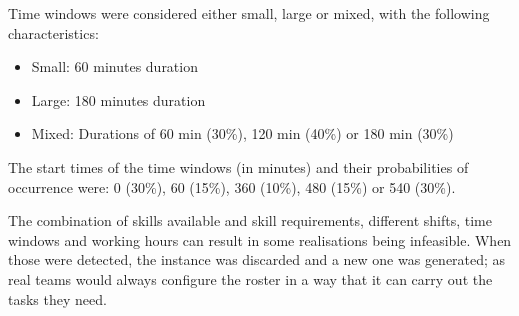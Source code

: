 Time windows were considered either small, large or mixed, with the following characteristics:
\begin{itemize}
	\item Small: 60 minutes duration
	\item Large: 180 minutes duration
	\item Mixed: Durations of 60 min (30\%), 120 min (40\%) or 180 min (30\%)
\end{itemize}
The start times of the time windows (in minutes) and their probabilities of occurrence were: 0 (30\%), 60 (15\%), 360 (10\%), 480 (15\%) or 540 (30\%). 

The combination of skills available and skill requirements, different shifts, time windows and working hours can result in some realisations being infeasible. When those were detected, the instance was discarded and a new one was generated; as real teams would always configure the roster in a way that it can carry out the tasks they need.


